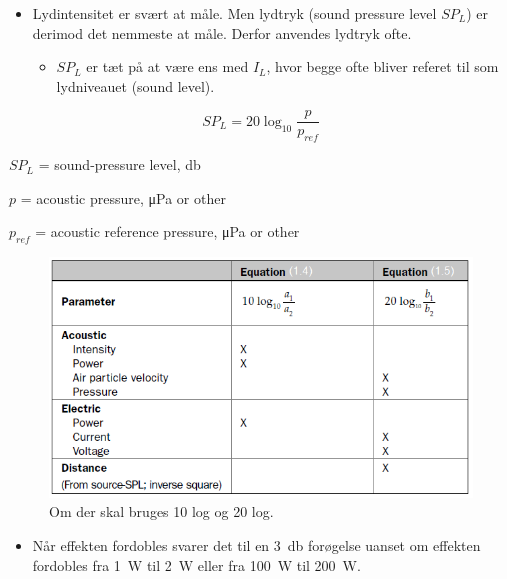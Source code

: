 \begin{itemize}
	\item Lydintensitet er svært at måle. Men lydtryk (sound pressure level $SP_L$) er derimod det nemmeste at måle. Derfor anvendes lydtryk ofte.
	\begin{itemize}
		\item $SP_L$ er tæt på at være ens med $I_L$, hvor begge ofte bliver referet til som lydniveauet (sound level).
	\end{itemize}
\end{itemize}

\begin{equation}\label{eq:spl}
SP_L = 20\log_{10}\frac{p}{p_{ref}}
\end{equation}

\begin{description}
	\item $SP_L$ = sound-pressure level, \si{\decibel}
	\item $p$ = acoustic pressure, \si{\micro\pascal} or other
	\item $p_{ref}$ = acoustic reference pressure, \si{\micro\pascal}  or other
\end{description}

\begin{figure} [H]
	\centering
	\includegraphics[width=\linewidth]{graphics/6.png}
	\caption{Om der skal bruges 10 log og 20 log. }
	\label{fig:6}
\end{figure}

\begin{itemize}
	\item Når effekten fordobles svarer det til en \SI{3}{\decibel} forøgelse uanset om effekten fordobles fra \SI{1}{\watt} til \SI{2}{\watt} eller fra \SI{100}{\watt} til \SI{200}{\watt}.
\end{itemize}

